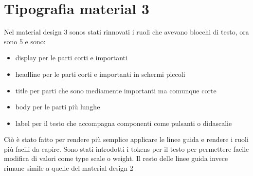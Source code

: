 \documentclass[12pt, a4paper]{report}
\begin{document}
	\section{Tipografia material 3}
		Nel material design 3 sonos stati rinnovati i ruoli che avevano blocchi di testo, ora sono 5 e sono:
		\begin{itemize}
			\item display per le parti corti e importanti
			\item headline per le parti corti e importanti in schermi piccoli
			\item title	per parti che sono mediamente importanti ma comunque corte
			\item body per le parti più lunghe
			\item label per il testo che accompagna componenti come pulsanti o didascalie
		\end{itemize}
		Ciò è stato fatto per rendere più semplice applicare le linee guida e rendere i ruoli più facili da capire.
		Sono stati introdotti i tokens per il testo per permettere facile modifica di valori come type scale o weight.
		Il resto delle linee guida invece rimane simile a quelle del material design 2
	


\printbibliography
\end{document}
